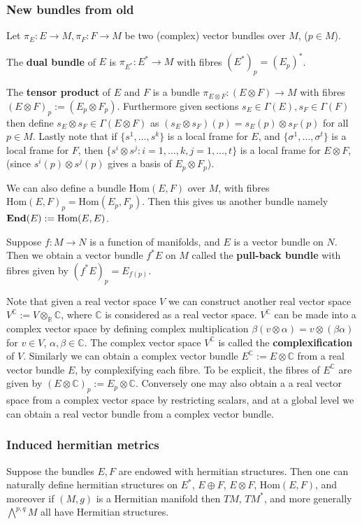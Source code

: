 \documentclass[a4paper]{article}
\theoremstyle{definition} \newtheorem*{definition}{Definition}
\theoremstyle{definition} \newtheorem*{definitions}{Definitions}
\theoremstyle{plain} \newtheorem{theorem}{Theorem}[section]
\theoremstyle{plain} \newtheorem{proposition}[theorem]{Proposition}
\theoremstyle{plain} \newtheorem{corollary}[theorem]{Corollary}
\theoremstyle{plain} \newtheorem{lemma}[theorem]{Lemma}
\theoremstyle{plain} \newtheorem{example}[theorem]{Example}
\newcommand{\defn}[1]{\textbf{#1}}
\newcommand{\realnos}{\mathbb{R}}
\newcommand{\complexnos}{\mathbb{C}}
\newcommand{\Hom}{\text{Hom}}
\newcommand{\End}{\text{End}}
\begin{document}
\subsubsection{New bundles from old}
Let $\pi_E:E\to M, \pi_F:F\to M$ be two (complex) vector bundles over $M$, ($p\in M$).

The \defn{dual bundle} of $E$ is $\pi_{E^\ast}:E^\ast \to M$ with fibres $(E^*)_p = (E_p)^*$.

The \defn{tensor product} of $E$ and $F$ is a bundle $\pi_{E\otimes F}:(E\otimes F) \to M$ with fibres $(E\otimes F)_p:=(E_p \otimes F_p)$. Furthermore given sections $s_E\in \Gamma(E), s_F\in \Gamma(F)$ then define $s_E\otimes s_F\in \Gamma(E\otimes F)$ as $(s_E\otimes s_F)(p)=s_E(p)\otimes s_F(p)$ for all $p\in M$. Lastly note that if $\{s^1, \ldots, s^k\}$ is a local frame for $E$, and $\{\sigma^1,\ldots , \sigma^t\}$ is a local frame for $F$, then $\{s^i\otimes s^j : i=1,\ldots, k, j=1,\ldots , t\}$ is a local frame for $E\otimes F$, (since $s^i(p)\otimes s^j(p)$ gives a basis of $E_p\otimes F_p$).  

We can also define a bundle \defn{$\Hom(E,F)$} over $M$, with fibres $\Hom(E,F)_p = \Hom(E_p, F_p)$. Then this gives us another bundle namely $\defn{\End}(E):=\Hom(E,E)$. 

Suppose $f:M\to N$ is a function of manifolds, and $E$ is a vector bundle on $N$. Then we obtain a vector bundle $f^* E$ on $M$ called the \defn{pull-back bundle} with fibres given by $(f^*E)_p=E_{f(p)}$.

Note that given a real vector space $V$ we can construct another real vector space $V^\complexnos := V\otimes_\realnos \complexnos$, where $\complexnos$ is considered as a real vector space. $V^\complexnos$ can be made into a complex vector space by defining complex multiplication $\beta(v\otimes \alpha) = v\otimes (\beta \alpha)$ for $v\in V$, $\alpha, \beta \in \complexnos$. The complex vector space $V^\complexnos$ is called the \defn{complexification} of $V$. Similarly we can obtain a complex vector bundle $E^\complexnos := E\otimes \complexnos$ from a real vector bundle $E$, by complexifying each fibre. To be explicit, the fibres of $E^\complexnos$ are given by $(E\otimes \complexnos)_p := E_p\otimes \complexnos$.
Conversely one may also obtain a a real vector space from a complex vector space by restricting scalars, and at a global level we can obtain a real vector bundle from a complex vector bundle. 

\subsubsection{Induced hermitian metrics}
Suppose the bundles $E, F$ are endowed with hermitian structures. Then one can naturally define hermitian structures on $E^*$, $E\oplus F$, $E\otimes F$, $\Hom(E, F)$, and moreover if $(M, g)$ is a Hermitian manifold then $TM$, $TM^*$, and more generally $\bigwedge^{p,q} M$ all have Hermitian structures.
\end{document}
